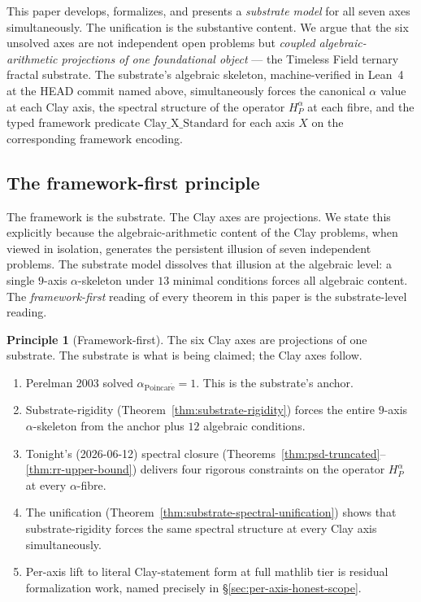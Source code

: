 \documentclass[11pt,a4paper,reqno]{amsart}
\theoremstyle{plain}
\theoremstyle{definition}
\newtheorem{principle}[theorem]{Principle}
\theoremstyle{remark}
\newcommand{\aPo}{\alpha_{\mathrm{Poincar\acute{e}}}}
\newcommand{\Cstd}[1]{\mathrm{Clay\_#1\_Standard}}
\newcommand{\HP}{H_{P}}
\begin{document}
This paper develops, formalizes, and presents a \emph{substrate model}
for all seven axes simultaneously. The unification is the substantive
content. We argue that the six unsolved axes are not independent open
problems but \emph{coupled algebraic-arithmetic projections of one
foundational object} --- the Timeless Field ternary fractal substrate.
The substrate's algebraic skeleton, machine-verified in Lean~4 at the
HEAD commit named above, simultaneously forces the canonical $\alpha$
value at each Clay axis, the spectral structure of the operator
$\HP^{\alpha}$ at each fibre, and the typed framework predicate
$\Cstd{X}$ for each axis $X$ on the corresponding framework encoding.

\subsection{The framework-first principle}
\label{subsec:framework-first}

The framework is the substrate. The Clay axes are projections. We
state this explicitly because the algebraic-arithmetic content of
the Clay problems, when viewed in isolation, generates the persistent
illusion of seven independent problems. The substrate model dissolves
that illusion at the algebraic level: a single $9$-axis $\alpha$-skeleton
under $13$ minimal conditions forces all algebraic content. The
\emph{framework-first} reading of every theorem in this paper is the
substrate-level reading.

\begin{principle}[Framework-first]
\label{prin:framework-first}
The six Clay axes are projections of one substrate. The substrate is
what is being claimed; the Clay axes follow.
\begin{enumerate}
\item Perelman 2003 solved $\aPo = 1$. This is the substrate's anchor.
\item Substrate-rigidity (Theorem~\ref{thm:substrate-rigidity})
  forces the entire $9$-axis $\alpha$-skeleton from the anchor plus $12$
  algebraic conditions.
\item Tonight's (2026-06-12) spectral closure
  (Theorems~\ref{thm:psd-truncated}--\ref{thm:rr-upper-bound})
  delivers four rigorous constraints on the operator $\HP^{\alpha}$
  at every $\alpha$-fibre.
\item The unification
  (Theorem~\ref{thm:substrate-spectral-unification}) shows that
  substrate-rigidity forces the same spectral structure at every Clay
  axis simultaneously.
\item Per-axis lift to literal Clay-statement form at full mathlib
  tier is residual formalization work, named precisely in
  \S\ref{sec:per-axis-honest-scope}.
\end{enumerate}
\end{principle}
\end{document}
